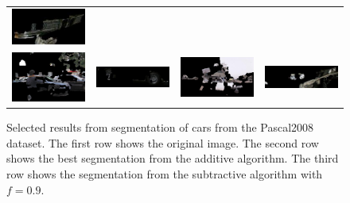 \documentclass[10pt,twocolumn,letterpaper]{article}
\begin{document}
\begin{figure}[p]
\begin{tabular}{ p{4cm} p{4cm} p{4cm} p{4cm} }
\includegraphics[width=3.95cm]{figures/results/a2008_007529.jpg.eps} \\
\includegraphics[width=3.95cm]{figures/results/b2008_002483.jpg.eps} &
\includegraphics[width=3.95cm]{figures/results/b2008_007466.jpg.eps} &
\includegraphics[width=3.95cm]{figures/results/b2008_005378.jpg.eps} &
\includegraphics[width=3.95cm]{figures/results/b2008_007529.jpg.eps} \\
\end{tabular}
\caption{Selected results from segmentation of cars from the Pascal2008
dataset.  The first row shows the original image.  The second row shows
the best segmentation from the additive algorithm.  The third row shows
the segmentation from the subtractive algorithm with $f=0.9$.}
\label{fig:bad_results}
\end{figure}
\end{document}
